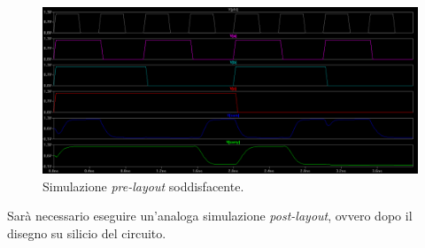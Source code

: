 \begin{figure}[hbt!]
	\centering
	\includegraphics[width=1.5\textwidth, angle=90]{figure/sim_FA_Good.png}
	\caption{Simulazione \textit{pre-layout} soddisfacente.}
	\label{fig:simulazionePreLayoutSoddisfacente}
\end{figure}

Sarà necessario eseguire un'analoga simulazione \textit{post-layout}, ovvero dopo il disegno su silicio del circuito.